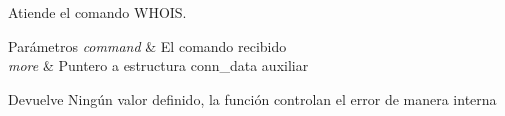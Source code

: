 Atiende el comando W\+H\+O\+I\+S. 


\begin{DoxyParams}{Parámetros}
{\em command} & El comando recibido \\
\hline
{\em more} & Puntero a estructura conn\+\_\+data auxiliar \\
\hline
\end{DoxyParams}
\begin{DoxyReturn}{Devuelve}
Ningún valor definido, la función controlan el error de manera interna 
\end{DoxyReturn}
